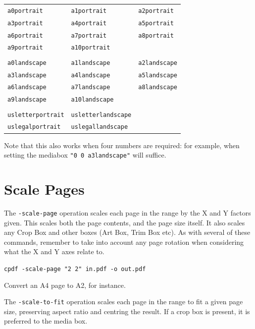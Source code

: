 \documentclass{book}
\newcommand{\smallgap}{\bigskip}
\begin{document}
{\small
  \smallgap
  \begin{tabular}{lll}
  \texttt{a0portrait} & \texttt{a1portrait} & \texttt{a2portrait} \\
  \texttt{a3portrait} & \texttt{a4portrait} & \texttt{a5portrait} \\
  \texttt{a6portrait} & \texttt{a7portrait} & \texttt{a8portrait} \\
  \texttt{a9portrait} & \texttt{a10portrait} & \\
  \\
  \texttt{a0landscape} & \texttt{a1landscape} & \texttt{a2landscape} \\
  \texttt{a3landscape} & \texttt{a4landscape} & \texttt{a5landscape} \\
  \texttt{a6landscape} & \texttt{a7landscape} & \texttt{a8landscape} \\
  \texttt{a9landscape} & \texttt{a10landscape} & \\
  \\
  \texttt{usletterportrait} & \texttt{usletterlandscape} & \\
  \texttt{uslegalportrait} & \texttt{uslegallandscape} &
  \end{tabular}
}
\bigskip

\noindent Note that this also works when four numbers are required: for example, when setting the mediabox \texttt{"0 0 a3landscape"} will suffice.

  \section{Scale Pages}
  The \texttt{-scale-page} operation scales each page in the range by the X and
Y factors given. This scales both the page contents, and the page size itself. It also scales any Crop Box and other boxes (Art Box, Trim Box etc). As with several of these commands, remember to take into account any page rotation when considering what the X and Y axes relate to.

  \begin{framed}
  \small\noindent\verb!cpdf -scale-page "2 2" in.pdf -o out.pdf!

  \vspace{2.5mm}
  \noindent Convert an A4 page to A2, for instance.
  \end{framed}

  \noindent The \texttt{-scale-to-fit} operation scales each page in the range to fit a
  given page size, preserving aspect ratio and centring the result. If a crop box is present, it is preferred to the media box.
\end{document}
